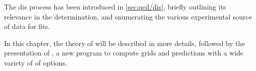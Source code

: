 
The \acrfull{dis} process has been introduced in \cref{sec:qcd/dis}, briefly
outlining its relevance in the \pdf determination, and enumerating the various
experimental source of \dis data for \pdf fits.

In this chapter, the theory of \dis will be described in more details, followed
by the presentation of \yadism, a new program to compute \dis grids and
predictions with a wide variety of of options.

